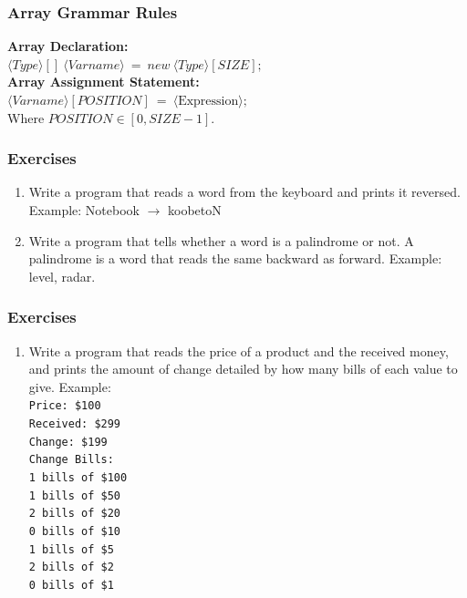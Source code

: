 \documentclass{beamer}
\begin{document}
	\begin{frame}
		\frametitle{Array Grammar Rules}
		\textbf{Array Declaration:}\\
		$\langle Type \rangle []\ \langle Varname \rangle\ =\ new\ \langle Type \rangle [SIZE];$\\
		\vskip20pt
		\textbf{Array Assignment Statement:}\\
		$\langle Varname \rangle [POSITION]\ =\ \langle \text{Expression}\rangle;$\\
		Where $POSITION \in [0, SIZE-1]$.
	\end{frame}

	\begin{frame}
		\frametitle{Exercises}
		\begin{enumerate}
			\item Write a program that reads a word from the keyboard and prints it reversed. Example: Notebook $\to$ koobetoN
			\item Write a program that tells whether a word is a palindrome or not. A palindrome is a word that reads the same backward as forward. Example: level, radar.
		\end{enumerate}
	\end{frame}

	\begin{frame}
		\frametitle{Exercises}
		\begin{enumerate}
			\item Write a program that reads the price of a product and the received money, and prints the amount of change detailed by how many bills of each value to give. Example:\\
			\pause
			\texttt{Price: \$100\\
			Received: \$299\\
			Change: \$199\\
			Change Bills: \\
			1 bills of \$100\\
			1 bills of \$50\\
			2 bills of \$20\\
			0 bills of \$10\\
			1 bills of \$5\\
			2 bills of \$2\\
			0 bills of \$1}
		\end{enumerate}
	\end{frame}

\end{document}
